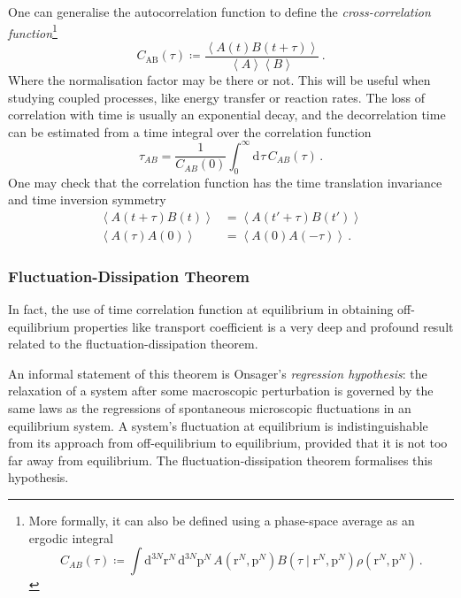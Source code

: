 \documentclass{article}
\theoremstyle{plain}\theoremheaderfont{\normalfont\itshape}\theorembodyfont{\rmfamily}\theoremseparator{.}\newtheorem*{rem}{Remark}\newtheorem*{ex}{Example}\newtheorem*{proof}{Proof}\newtheorem*{altp}{Alternative proof}
\theoremstyle{plain}\theoremheaderfont{\normalfont\bfseries}\theorembodyfont{\rmfamily}\theoremseparator{.}\newtheorem{thm}{Theorem}[section]\newtheorem{lem}[thm]{Lemma}\newtheorem{prop}[thm]{Proposition}\newtheorem*{cor}{Corollary}\newtheorem{defn}[thm]{Definition}\newtheorem{clm}[thm]{Claim}\newtheorem{clminproof}{Claim}\newtheorem{alg}[thm]{Algorithm}\newtheorem{hyp}[thm]{Hypothesis}\newtheorem{law}[thm]{Law}
\theoremstyle{break}\theoremheaderfont{\normalfont\itshape}\theorembodyfont{\rmfamily}\theoremseparator{.\medskip}\newtheorem*{proofskip}{Proof}\newtheorem*{exs}{Examples}\newtheorem*{rems}{Remarks}
\theoremstyle{break}\theoremheaderfont{\normalfont\bfseries}\theorembodyfont{\rmfamily}\theoremseparator{.\medskip}\newtheorem{lemskip}[thm]{Lemma}\newtheorem{defnskip}[thm]{Definition}\newtheorem{propskip}[thm]{Proposition}\newtheorem{thmskip}[thm]{Theorem}
\numberwithin{equation}{section}
\newcommand{\dd}[2][]{\mathrm{d}^{#1} #2\,}
\newcommand{\eval}[1]{\left\langle #1 \right\rangle}
\newcommand{\vb}[1]{\bm{\mathrm{#1}}}
\begin{document}
    One can generalise the autocorrelation function to define the \textit{cross-correlation function}\footnote{More formally, it can also be defined using a phase-space average as an ergodic integral
    \begin{equation}
        C_{AB}(\tau)\coloneqq\int\dd[3N]{\vb{r}^N}\dd[3N]{\vb{p}^N}A(\vb{r}^N,\vb{p}^N)B(\tau\mid\vb{r}^N,\vb{p}^N)\rho(\vb{r}^N,\vb{p}^N)\,.
    \end{equation}}
    \begin{equation}
        C_{\text{AB}}(\tau)\coloneqq\frac{\eval{A(t)B(t+\tau)}}{\eval{A}\eval{B}}\,.
    \end{equation}
    Where the normalisation factor may be there or not. This will be useful when studying coupled processes, like energy transfer or reaction rates. The loss of correlation with time is usually an exponential decay, and the decorrelation time can be estimated from a time integral over the correlation function
    \begin{equation}
        \tau_{AB}=\frac{1}{C_{AB}(0)}\int_{0}^{\infty}\dd{\tau}C_{AB}(\tau)\,.
    \end{equation}
    One may check that the correlation function has the time translation invariance and time inversion symmetry
    \begin{align}
        \eval{A(t+\tau)B(t)}&=\eval{A(t'+\tau)B(t')}\\
        \eval{A(\tau)A(0)}&=\eval{A(0)A(-\tau)}\,.
    \end{align}
    \subsubsection{Fluctuation-Dissipation Theorem}
    In fact, the use of time correlation function at equilibrium in obtaining off-equilibrium properties like transport coefficient is a very deep and profound result related to the fluctuation-dissipation theorem.
    
    An informal statement of this theorem is Onsager's \textit{regression hypothesis}: the relaxation of a system after some macroscopic perturbation is governed by the same laws as the regressions of spontaneous microscopic fluctuations in an equilibrium system. A system's fluctuation at equilibrium is indistinguishable from its approach from off-equilibrium to equilibrium, provided that it is not too far away from equilibrium. The fluctuation-dissipation theorem formalises this hypothesis.
\end{document}
